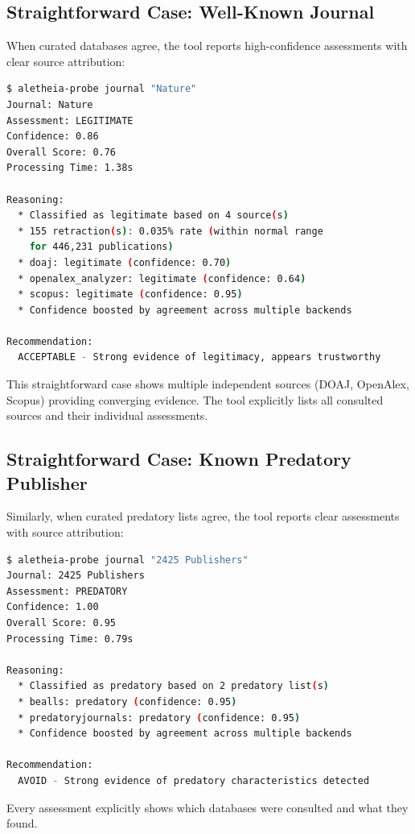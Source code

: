 \documentclass[fleqn,10pt]{SelfArx}
\begin{document}
\subsection{Straightforward Case: Well-Known Journal}
When curated databases agree, the tool reports high-confidence
assessments with clear source attribution:

\begin{lstlisting}[language=bash,basicstyle=\ttfamily\scriptsize]
$ aletheia-probe journal "Nature"
Journal: Nature
Assessment: LEGITIMATE
Confidence: 0.86
Overall Score: 0.76
Processing Time: 1.38s

Reasoning:
  * Classified as legitimate based on 4 source(s)
  * 155 retraction(s): 0.035% rate (within normal range
    for 446,231 publications)
  * doaj: legitimate (confidence: 0.70)
  * openalex_analyzer: legitimate (confidence: 0.64)
  * scopus: legitimate (confidence: 0.95)
  * Confidence boosted by agreement across multiple backends

Recommendation:
  ACCEPTABLE - Strong evidence of legitimacy, appears trustworthy
\end{lstlisting}

This straightforward case shows multiple independent sources (DOAJ,
OpenAlex, Scopus) providing converging evidence. The tool explicitly
lists all consulted sources and their individual assessments.

\subsection{Straightforward Case: Known Predatory Publisher}

Similarly, when curated predatory lists agree, the tool reports clear
assessments with source attribution:

\begin{lstlisting}[language=bash,basicstyle=\ttfamily\scriptsize]
$ aletheia-probe journal "2425 Publishers"
Journal: 2425 Publishers
Assessment: PREDATORY
Confidence: 1.00
Overall Score: 0.95
Processing Time: 0.79s

Reasoning:
  * Classified as predatory based on 2 predatory list(s)
  * bealls: predatory (confidence: 0.95)
  * predatoryjournals: predatory (confidence: 0.95)
  * Confidence boosted by agreement across multiple backends

Recommendation:
  AVOID - Strong evidence of predatory characteristics detected
\end{lstlisting}

Every assessment explicitly shows which databases were consulted and
what they found.
\end{document}
